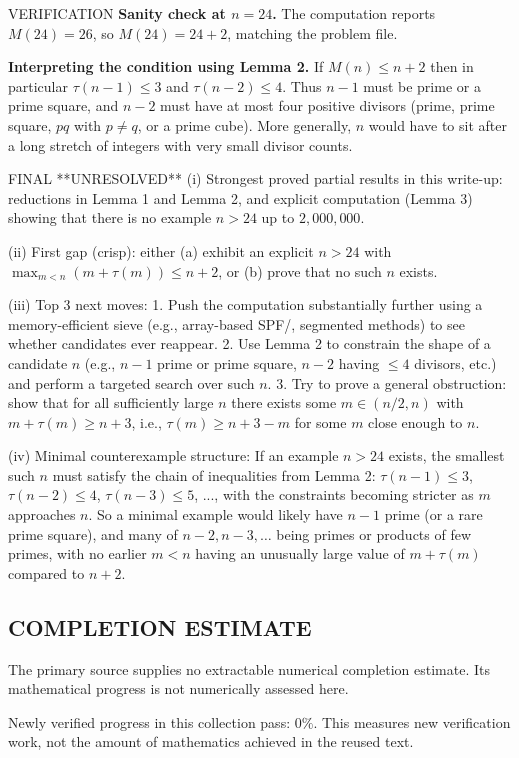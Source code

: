 VERIFICATION
\textbf{Sanity check at $n=24$.}
The computation reports $M(24)=26$, so $M(24)=24+2$, matching the problem file.

\textbf{Interpreting the condition using Lemma 2.}
If $M(n)\le n+2$ then in particular $\tau(n-1)\le 3$ and $\tau(n-2)\le 4$.
Thus $n-1$ must be prime or a prime square, and $n-2$ must have at most four
positive divisors (prime, prime square, $pq$ with $p\neq q$, or a prime cube).
More generally, $n$ would have to sit after a long stretch of integers with very
small divisor counts.

FINAL
**UNRESOLVED**
(i) Strongest proved partial results in this write-up: reductions in Lemma 1 and
Lemma 2, and explicit computation (Lemma 3) showing that there is no example
$n>24$ up to $2{,}000{,}000$.

(ii) First gap (crisp): either (a) exhibit an explicit $n>24$ with
$\max_{m<n}(m+\tau(m))\le n+2$, or (b) prove that no such $n$ exists.

(iii) Top 3 next moves:
1. Push the computation substantially further using a memory-efficient sieve
(e.g., array-based SPF/\tau, segmented methods) to see whether candidates ever
reappear.
2. Use Lemma 2 to constrain the shape of a candidate $n$ (e.g., $n-1$ prime or
prime square, $n-2$ having $\le4$ divisors, etc.) and perform a targeted search
over such $n$.
3. Try to prove a general obstruction: show that for all sufficiently large $n$
there exists some $m\in(n/2,n)$ with $m+\tau(m)\ge n+3$, i.e.,
$\tau(m)\ge n+3-m$ for some $m$ close enough to $n$.

(iv) Minimal counterexample structure:
If an example $n>24$ exists, the smallest such $n$ must satisfy the chain of
inequalities from Lemma 2:
$\tau(n-1)\le 3$, $\tau(n-2)\le 4$, $\tau(n-3)\le 5$, ..., with the constraints
becoming stricter as $m$ approaches $n$.
So a minimal example would likely have $n-1$ prime (or a rare prime square), and
many of $n-2,n-3,\dots$ being primes or products of few primes, with no earlier
$m<n$ having an unusually large value of $m+\tau(m)$ compared to $n+2$.


\subsection*{COMPLETION ESTIMATE}
The primary source supplies no extractable numerical completion estimate. Its mathematical progress is not numerically assessed here.

Newly verified progress in this collection pass: $0\%$. This measures new verification work, not the amount of mathematics achieved in the reused text.

